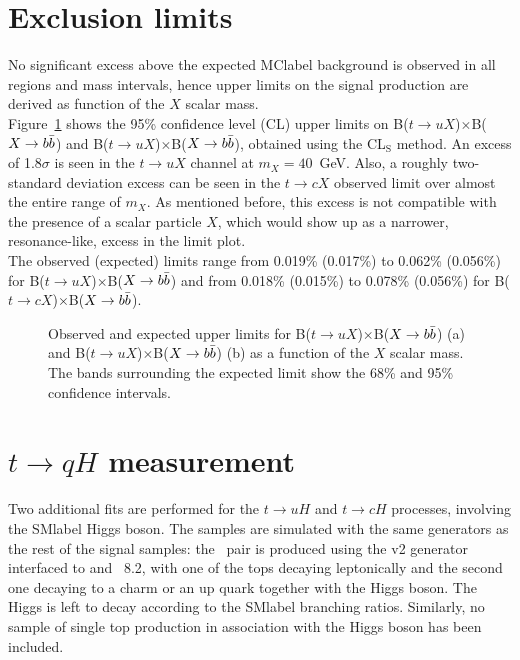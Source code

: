 \clearpage

\section{Exclusion limits}

No significant excess above the expected \acrshort{MClabel} background is observed in all regions and mass intervals, hence upper limits on the signal production are derived as function of the $X$ scalar mass.\\

Figure~\ref{tqX:xseclimits} shows the 95\% confidence level (CL) upper limits on B($t\to uX$)$\times$B($X\to b\bar{b}$) and B($t\to uX$)$\times$B($X\to b\bar{b}$), obtained using the CL$_\text{S}$ method. An excess of 1.8$\sigma$ is seen in the $t\to uX$ channel at $m_X=40$~GeV. Also, a roughly two-standard deviation excess can be seen in the $t\to cX$ observed limit over almost the entire range of $m_X$. As mentioned before, this excess is not compatible with the presence of a scalar particle $X$, which would show up as a narrower, resonance-like, excess in the limit plot.\\

The observed (expected) limits range from 0.019\% (0.017\%) to 0.062\% (0.056\%) for B($t\to uX$)$\times$B($X\to b\bar{b}$) and from 0.018\% (0.015\%) to 0.078\% (0.056\%) for B($t\to cX$)$\times$B($X\to b\bar{b}$).\\

\begin{figure}[htb]
    \RawFloats
    \centering
    \caption{Observed and expected upper limits for B($t\to uX$)$\times$B($X\to b\bar{b}$) (a) and B($t\to uX$)$\times$B($X\to b\bar{b}$) (b) as a function of the $X$ scalar mass. The bands surrounding the expected limit show the 68\% and 95\% confidence intervals.}
    \label{tqX:xseclimits}
\end{figure}

\section{$t\to qH$ measurement}

Two additional fits are performed for the $t\to uH$ and $t\to cH$ processes, involving the \acrshort{SMlabel} Higgs boson. The samples are simulated with the same generators as the rest of the signal samples: the \ttbar\ pair is produced using the \POWHEGBOX v2 generator interfaced to \MADSPIN and \PYTHIA~8.2, with one of the tops decaying leptonically and the second one decaying to a charm or an up quark together with the Higgs boson. The Higgs is left to decay according to the \acrshort{SMlabel} branching ratios. Similarly, no sample of single top production in association with the Higgs boson has been included.\\

